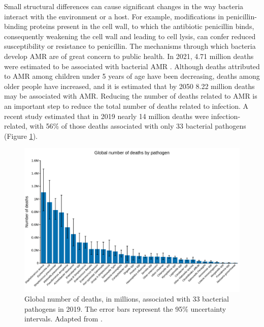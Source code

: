 Small structural differences can cause significant changes in the way bacteria interact with the environment or a host. For example, modifications in penicillin-binding proteins present in the cell wall, to which the antibiotic penicillin binds, consequently weakening the cell wall and leading to cell lysis, can confer reduced susceptibility or resistance to penicillin. The mechanisms through which bacteria develop \ac{AMR} are of great concern to public health. In 2021, 4.71 million deaths were estimated to be associated with bacterial \ac{AMR} \cite{naghavi_global_2024}. Although deaths attributed to \ac{AMR} among children under 5 years of age have been decreasing, deaths among older people have increased, and it is estimated that by 2050 8.22 million deaths may be associated with \ac{AMR}. Reducing the number of deaths related to \ac{AMR} is an important step to reduce the total number of deaths related to infection. A recent study estimated that in 2019 nearly 14 million deaths were infection-related, with 56\% of those deaths associated with only 33 bacterial pathogens (Figure \ref{fig:introduction_figure1}).

\begin{figure}[!ht]
    \centering
    \includegraphics[angle=0,width=\textwidth]{figures/introduction/Figure1.pdf}
    \caption[Global number of deaths, in millions, associated with 33 bacterial pathogens in 2019]{Global number of deaths, in millions, associated with 33 bacterial pathogens in 2019. The error bars represent the 95\% uncertainty intervals. Adapted from \cite{ikuta_global_2022}.}
    \label{fig:introduction_figure1}
\end{figure}

